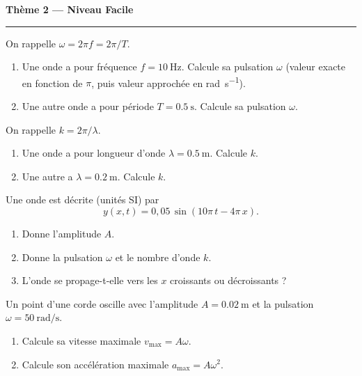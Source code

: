 \documentclass[11pt,a4paper]{article}
\begin{document}
\begin{center}
{\large\bfseries\color{primarydark} Thème 2 — Niveau Facile}\\[-2pt]
{\color{primary}\rule{5cm}{1pt}}
\end{center}

\begin{exo}
On rappelle $\omega=2\pi f=2\pi/T$.
\begin{enumerate}[label=\alph*)]
  \item Une onde a pour fréquence $f=\SI{10}{\hertz}$. Calcule sa pulsation $\omega$
        (valeur exacte en fonction de $\pi$, puis valeur approchée en \si{\radian\per\second}).
  \item Une autre onde a pour période $T=\SI{0.5}{\second}$. Calcule sa pulsation $\omega$.
\end{enumerate}
\end{exo}

\begin{exo}
On rappelle $k=2\pi/\lambda$.
\begin{enumerate}[label=\alph*)]
  \item Une onde a pour longueur d'onde $\lambda=\SI{0.5}{\metre}$. Calcule $k$.
  \item Une autre a $\lambda=\SI{0.2}{\metre}$. Calcule $k$.
\end{enumerate}
\end{exo}

\begin{exo}
Une onde est décrite (unités SI) par
\[ y(x,t)=0{,}05\,\sin\!\left(10\pi\,t - 4\pi\,x\right). \]
\begin{enumerate}[label=\alph*)]
  \item Donne l'amplitude $A$.
  \item Donne la pulsation $\omega$ et le nombre d'onde $k$.
  \item L'onde se propage-t-elle vers les $x$ croissants ou décroissants ?
\end{enumerate}
\end{exo}

\begin{exo}
Un point d'une corde oscille avec l'amplitude $A=\SI{0.02}{\metre}$ et la pulsation
$\omega=\SI{50}{\radian\per\second}$.
\begin{enumerate}[label=\alph*)]
  \item Calcule sa vitesse maximale $v_{\max}=A\omega$.
  \item Calcule son accélération maximale $a_{\max}=A\omega^{2}$.
\end{enumerate}
\end{exo}
\end{document}
